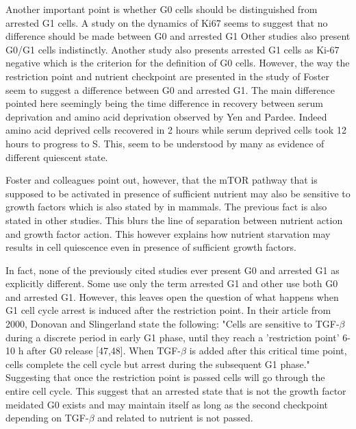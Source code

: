 \documentclass[11pt,a4paper]{article}
\begin{document}
Another important point is whether G0 cells should be distinguished from arrested G1 cells. A study on the dynamics of Ki67 seems to suggest that no difference should be made between G0 and arrested G1\cite{Miller2018} Other studies also present G0/G1 cells indistinctly.\cite{Jiang1998}\cite{Song2018} Another study also presents arrested G1 cells as Ki-67 negative which is the criterion for the definition of G0 cells.\cite{Sobecki2017} However, the way the restriction point and nutrient checkpoint are presented in the study of Foster seem to suggest a difference between G0 and arrested G1. The main difference pointed here seemingly being the time difference in recovery between serum deprivation and amino acid deprivation observed by Yen and Pardee.\cite{Yen1978} Indeed amino acid deprived cells recovered in 2 hours while serum deprived cells took 12 hours to progress to S. This, seem to be understood by many as evidence of different quiescent state.

Foster and colleagues point out, however, that the mTOR pathway that is supposed to be activated in presence of sufficient nutrient may also be sensitive to growth factors which is also stated by in mammals. The previous fact is also stated in other studies.\cite{Fingar2004} This blurs the line of separation between nutrient action and growth factor action. This however explains how nutrient starvation may results in cell quiescence even in presence of sufficient growth factors.

In fact, none of the previously cited studies ever present G0 and arrested G1 as explicitly different. Some use only the term arrested G1 and other use both G0 and arrested G1. However, this leaves open the question of what happens when G1 cell cycle arrest is induced after the restriction point. In their article from 2000, Donovan and Slingerland state the following: "Cells are sensitive to TGF-$\beta$ during a discrete period in early G1 phase, until they reach a 'restriction point' 6-10 h after G0 release [47,48]. When TGF-$\beta$ is added after this critical time point, cells complete the cell cycle but arrest during the subsequent G1 phase." Suggesting that once the restriction point is passed cells will go through the entire cell cycle.\cite{Donovan2000} This suggest that an arrested state that is not the growth factor meidated G0 exists and may maintain itself as long as the second checkpoint depending on TGF-$\beta$ and related to nutrient is not passed. 
\end{document}
